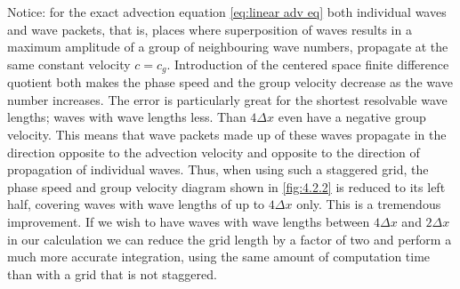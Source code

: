 Notice: for the exact advection equation \ref{eq:linear adv eq} both individual waves and wave packets, that is, places where superposition of waves results in a maximum amplitude of a group of neighbouring wave numbers, propagate at the same constant velocity $c=c_g$. Introduction of the centered space finite difference quotient both makes the phase speed and the group velocity decrease as the wave number increases. The error is particularly great for the shortest resolvable wave lengths; waves with wave lengths less. Than $4\Delta x$ even have a negative group velocity. This means that wave packets made up of these waves propagate in the direction opposite to the advection velocity and opposite to the direction of propagation of individual waves.
Thus, when using such a staggered grid, the phase speed and group velocity diagram shown in \ref{fig:4.2.2} is reduced to its left half, covering waves with wave lengths of up to $4\Delta x$ only. This is a tremendous improvement. If we wish to have waves with wave lengths between $4\Delta x$ and $2\Delta x$ in our calculation we can reduce the grid length by a factor of two and perform a much more accurate integration, using the same amount of computation time than with a grid that is not staggered.
